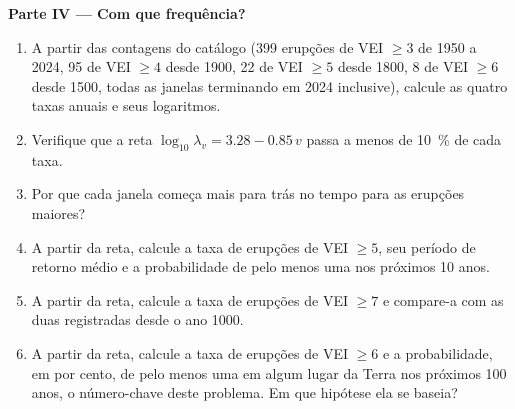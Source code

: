 \begin{problem}
\noindent\textbf{Parte IV --- Com que frequência?}
\begin{enumerate}[resume]
\item A partir das contagens do catálogo (399 erupções de VEI $\ge 3$ de 1950 a
2024, 95 de VEI $\ge 4$ desde 1900, 22 de VEI $\ge 5$ desde 1800, 8 de VEI $\ge 6$ desde
1500, todas as janelas terminando em 2024 inclusive), calcule as quatro taxas anuais e
seus logaritmos.
\item Verifique que a reta $\log_{10}\lambda_v = 3.28 - 0.85\,v$ passa a menos de
\qty{10}{\percent} de cada taxa.
\item Por que cada janela começa mais para trás no tempo para as erupções maiores?
\item A partir da reta, calcule a taxa de erupções de VEI $\ge 5$, seu período
de retorno médio e a probabilidade de pelo menos uma nos próximos 10 anos.
\item A partir da reta, calcule a taxa de erupções de VEI $\ge 7$ e compare-a
com as duas registradas desde o ano 1000.
\item A partir da reta, calcule a taxa de erupções de VEI $\ge 6$ e a
probabilidade, em por cento, de pelo menos uma em algum lugar da Terra nos próximos 100
anos, o número-chave deste problema. Em que hipótese ela se baseia?
\end{enumerate}
\end{problem}
